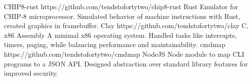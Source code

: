 \documentclass{article}
\begin{document}
\ProjectEntry
  {CHIP8-rust}
  {https://github.com/tendstofortytwo/chip8-rust}
  {Rust}
  {Emulator for CHIP-8 microprocessor. Simulated behavior of machine instructions with Rust, created graphics in framebuffer.}
\vspace{1.5mm}
\ProjectEntry
  {Clay}
  {https://github.com/tendstofortytwo/clay}
  {C, x86 Assembly}
  {A minimal x86 operating system. Handled tasks like interrupts, timers, paging, while balancing performance and maintainability.}
\vspace{1.5mm}
\ProjectEntry
  {cmdmap}
  {https://github.com/tendstofortytwo/cmdmap}
  {NodeJS}
  {Node module to map CLI programs to a JSON API. Designed abstraction over standard library features for improved security.}
\end{document}
